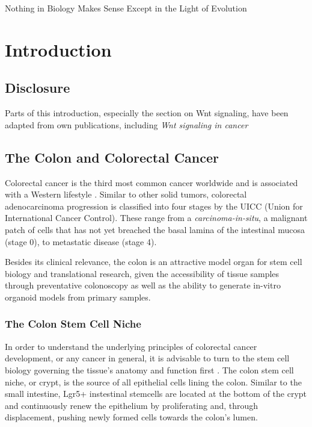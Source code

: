 \begin{savequote}[75mm]
Nothing in Biology Makes Sense Except in the Light of Evolution
\end{savequote}

\chapter{Introduction}
\label{introduction}
\begin{flushleft}
\setlength{\parindent}{7ex}
\section{Disclosure}
Parts of this introduction, especially the section on Wnt signaling, have been adapted from own publications, including \textit{Wnt signaling in cancer} \cite{Zhan2017}

\section{The Colon and Colorectal Cancer}

Colorectal cancer is the third most common cancer worldwide and is associated with a Western lifestyle \cite{BrayGlobalCancerStatistics}. Similar to other solid tumors, colorectal adenocarcinoma progression is classified into four stages by the UICC (Union for International Cancer Control). These range from a \textit{carcinoma-in-situ}, a malignant patch of cells that has not yet breached the basal lamina of the intestinal mucosa (stage 0), to metastatic disease (stage 4).\par

Besides its clinical relevance, the colon is an attractive model organ for stem cell biology and translational research, given the accessibility of tissue samples through preventative colonoscopy as well as the ability to generate in-vitro organoid models from primary samples.

\subsection{The Colon Stem Cell Niche}
In order to understand the underlying principles of colorectal cancer development, or any cancer in general, it is advisable to turn to the stem cell biology governing the tissue's anatomy and function first \cite{CleversCancerStemCell}. The colon stem cell niche, or crypt, is the source of all epithelial cells lining the colon. Similar to the small intestine, Lgr5+ instestinal stemcells are located at the bottom of the crypt and continuously renew the epithelium by proliferating and, through displacement, pushing newly formed cells towards the colon's lumen.\par


\end{flushleft}
